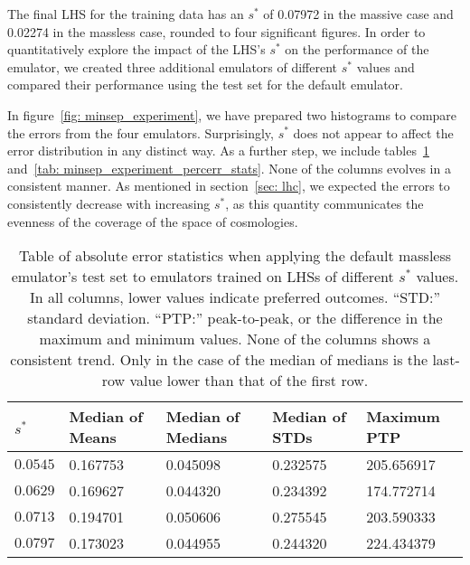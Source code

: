 The final LHS for the training data has an $s^*$ of 0.07972 in the massive 
case and 
0.02274 in the massless case, rounded to four significant figures. In order
to quantitatively explore the impact of the LHS's $s^*$ on the performance
of the emulator, we created three additional emulators of different $s^*$
values and compared their performance using the test set for the default
emulator.

In figure~\ref{fig: minsep_experiment}, we have prepared two histograms to
compare the errors from the four emulators. Surprisingly, $s^*$ does not
appear to affect the error distribution in any distinct way. As a further
step, we include tables~\ref{tab: minsep_experiment_delta_stats}
and~\ref{tab: minsep_experiment_percerr_stats}. None of the columns evolves
in a consistent manner. As mentioned in section~\ref{sec: lhc}, we expected 
the errors to consistently decrease with increasing $s^*$, as this quantity 
communicates the evenness of the coverage of the space of cosmologies.

\begin{table}[ht!]
\centering
\begin{tabular}{l|l|l|l|l}
\hline
$s^*$ & Median of Means & Median of Medians & Median of STDs & Maximum PTP \\ \hline
$0.0545$ & 0.167753 & 0.045098 & 0.232575 & 205.656917 \\
$0.0629$ & 0.169627 & 0.044320 & 0.234392 & 174.772714 \\
$0.0713$ & 0.194701 & 0.050606 & 0.275545 & 203.590333 \\
$0.0797$ & 0.173023 & 0.044955 & 0.244320 & 224.434379 \\
\end{tabular}
	\cprotect\caption[$s^*$ Experiment: Percent Error Statistics]{Table of
		absolute error statistics
		when applying the default massless emulator's test
		set to emulators trained on LHSs of different $s^*$ values. In all
		columns, lower values indicate preferred outcomes. ``STD:'' standard
		deviation. ``PTP:'' peak-to-peak, or the difference in the maximum
		and minimum values. None of the columns shows a consistent trend.
		Only in the case of the median of medians is the last-row value
		lower than that of the first row.}
 \label{tab: minsep_experiment_delta_stats}
\end{table}

